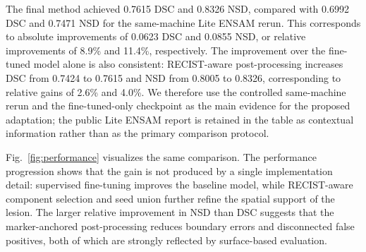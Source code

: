 \documentclass[runningheads]{llncs}
\begin{document}
The final method achieved 0.7615 DSC and 0.8326 NSD, compared with 0.6992 DSC and 0.7471 NSD for the same-machine Lite ENSAM rerun. This corresponds to absolute improvements of 0.0623 DSC and 0.0855 NSD, or relative improvements of 8.9\% and 11.4\%, respectively. The improvement over the fine-tuned model alone is also consistent: RECIST-aware post-processing increases DSC from 0.7424 to 0.7615 and NSD from 0.8005 to 0.8326, corresponding to relative gains of 2.6\% and 4.0\%. We therefore use the controlled same-machine rerun and the fine-tuned-only checkpoint as the main evidence for the proposed adaptation; the public Lite ENSAM report is retained in the table as contextual information rather than as the primary comparison protocol.

\begin{table}[!htbp]
\caption{Quantitative results on the public validation set. Metrics are averaged over 49 validation cases. The public Lite ENSAM report is included for external reference; the same-machine rerun is the primary controlled baseline.}
\label{tab:final-results}
\centering
{}
\end{table}

Fig.~\ref{fig:performance} visualizes the same comparison. The performance progression shows that the gain is not produced by a single implementation detail: supervised fine-tuning improves the baseline model, while RECIST-aware component selection and seed union further refine the spatial support of the lesion. The larger relative improvement in NSD than DSC suggests that the marker-anchored post-processing reduces boundary errors and disconnected false positives, both of which are strongly reflected by surface-based evaluation.
\end{document}
